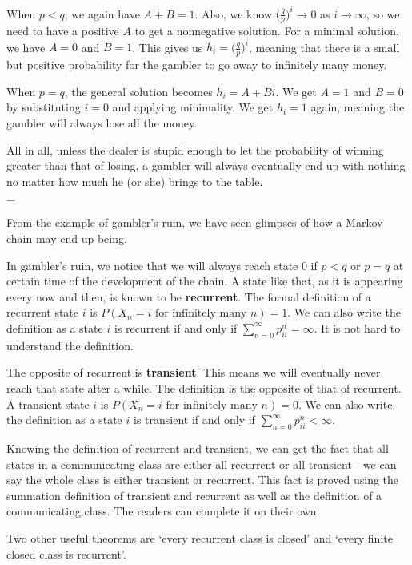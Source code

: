 \documentclass[11pt, a4paper, oneside]{book}
\theoremstyle{definition}
\newcommand{\breaking}{%
    \begin{center}
    $-$
    \end{center}%
}
\begin{document}
\noindent When $p < q$, we again have $A+B = 1$. Also, we know $\big(\frac{q}{p} \big)^i \to 0$ as $i \to \infty$, so we need to have a positive $A$ to get a nonnegative solution. For a minimal solution, we have $A = 0$ and $B = 1$. This gives us $h_i = \big(\frac{q}{p} \big)^i$, meaning that there is a small but positive probability for the gambler to go away to infinitely many money.

\noindent When $p = q$, the general solution becomes $h_i = A+Bi$. We get $A = 1$ and $B = 0$ by substituting $i = 0$ and applying minimality. We get $h_i = 1$ again, meaning the gambler will always lose all the money. 

\noindent All in all, unless the dealer is stupid enough to let the probability of winning greater than that of losing, a gambler will always eventually end up with nothing no matter how much he (or she) brings to the table. 

\breaking

\noindent From the example of gambler's ruin, we have seen glimpses of how a Markov chain may end up being. 

\noindent In gambler's ruin, we notice that we will always reach state 0 if $p < q$ or $p = q$ at certain time of the development of the chain. A state like that, as it is appearing every now and then, is known to be \textbf{recurrent}. The formal definition of a recurrent state $i$ is $P(X_n = i \text{ for infinitely many }n) = 1$. We can also write the definition as a state $i$ is recurrent if and only if $\sum_{n=0}^{\infty} p_{ii}^n = \infty$. It is not hard to understand the definition.

\noindent The opposite of recurrent is \textbf{transient}. This means we will eventually never reach that state after a while. The definition is the opposite of that of recurrent. A transient state $i$ is $P(X_n = i \text{ for infinitely many }n) = 0$. We can also write the definition as a state $i$ is transient if and only if $\sum_{n=0}^{\infty} p_{ii}^n < \infty$.

\noindent Knowing the definition of recurrent and transient, we can get the fact that all states in a communicating class are either all recurrent or all transient - we can say the whole class is either transient or recurrent. This fact is proved using the summation definition of transient and recurrent as well as the definition of a communicating class. The readers can complete it on their own.

\noindent Two other useful theorems are `every recurrent class is closed' and `every finite closed class is recurrent'.
\end{document}
